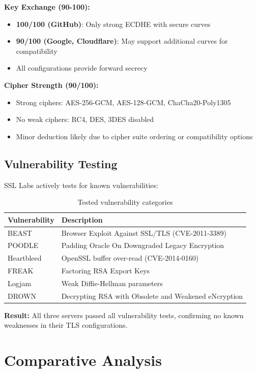 \documentclass[12pt,a4paper]{article}
\begin{document}
\textbf{Key Exchange (90-100):}
\begin{itemize}
    \item \textbf{100/100 (GitHub)}: Only strong ECDHE with secure curves
    \item \textbf{90/100 (Google, Cloudflare)}: May support additional curves for compatibility
    \item All configurations provide forward secrecy
\end{itemize}

\textbf{Cipher Strength (90/100):}
\begin{itemize}
    \item Strong ciphers: AES-256-GCM, AES-128-GCM, ChaCha20-Poly1305
    \item No weak ciphers: RC4, DES, 3DES disabled
    \item Minor deduction likely due to cipher suite ordering or compatibility options
\end{itemize}

\subsection{Vulnerability Testing}

SSL Labs actively tests for known vulnerabilities:

\begin{table}[H]
\centering
\begin{tabular}{@{}lp{8cm}@{}}
\toprule
\textbf{Vulnerability} & \textbf{Description} \\ \midrule
BEAST & Browser Exploit Against SSL/TLS (CVE-2011-3389) \\
POODLE & Padding Oracle On Downgraded Legacy Encryption \\
Heartbleed & OpenSSL buffer over-read (CVE-2014-0160) \\
FREAK & Factoring RSA Export Keys \\
Logjam & Weak Diffie-Hellman parameters \\
DROWN & Decrypting RSA with Obsolete and Weakened eNcryption \\
\bottomrule
\end{tabular}
\caption{Tested vulnerability categories}
\end{table}

\textbf{Result:} All three servers passed all vulnerability tests, confirming no known weaknesses in their TLS configurations.

\section{Comparative Analysis}
\end{document}
